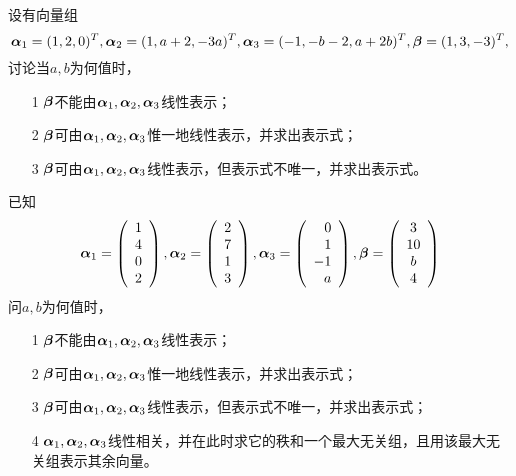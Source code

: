 \begin{frame}\ft{\subsecname}
  
  \begin{li}[2009-2010第一学期]
    设有向量组$$\boldsymbol{\alpha}_1=(1,2,0)^T,\boldsymbol{\alpha}_2=(1,a+2,-3a)^T,\boldsymbol{\alpha}_3=(-1,-b-2,a+2b)^T,\boldsymbol{\beta}=(1,3,-3)^T,$$
    讨论当$a,b$为何值时，
    \begin{itemize}
    \item[1] $\boldsymbol{\beta}$不能由$\boldsymbol{\alpha}_1,\boldsymbol{\alpha}_2,\boldsymbol{\alpha}_3$线性表示；
    \item[2] $\boldsymbol{\beta}$可由$\boldsymbol{\alpha}_1,\boldsymbol{\alpha}_2,\boldsymbol{\alpha}_3$惟一地线性表示，并求出表示式；
    \item[3] $\boldsymbol{\beta}$可由$\boldsymbol{\alpha}_1,\boldsymbol{\alpha}_2,\boldsymbol{\alpha}_3$线性表示，但表示式不唯一，并求出表示式。
    \end{itemize}
  \end{li}
  
\end{frame}



\begin{frame}\ft{\subsecname}
  
  \begin{li}[2012-2013第二学期]
    已知
    $$
    \boldsymbol{\alpha}_1=\left(
      \begin{array}{c}
        1\\4\\0\\2
      \end{array}
    \right),\boldsymbol{\alpha}_2=\left(
      \begin{array}{c}
        2\\7\\1\\3
      \end{array}
    \right),\boldsymbol{\alpha}_3=\left(
      \begin{array}{r}
        0\\1\\-1\\a
      \end{array}
    \right),\boldsymbol{\beta}=\left(
      \begin{array}{c}
        3\\10\\b\\4
      \end{array}
    \right)
    $$
    问$a,b$为何值时，
    \begin{itemize}
    \item[1] $\boldsymbol{\beta}$不能由$\boldsymbol{\alpha}_1,\boldsymbol{\alpha}_2,\boldsymbol{\alpha}_3$线性表示；
    \item[2] $\boldsymbol{\beta}$可由$\boldsymbol{\alpha}_1,\boldsymbol{\alpha}_2,\boldsymbol{\alpha}_3$惟一地线性表示，并求出表示式；
    \item[3] $\boldsymbol{\beta}$可由$\boldsymbol{\alpha}_1,\boldsymbol{\alpha}_2,\boldsymbol{\alpha}_3$线性表示，但表示式不唯一，并求出表示式；
    \item[4] $\boldsymbol{\alpha}_1,\boldsymbol{\alpha}_2,\boldsymbol{\alpha}_3$线性相关，并在此时求它的秩和一个最大无关组，且用该最大无关组表示其余向量。
    \end{itemize}
  \end{li}  
\end{frame}
